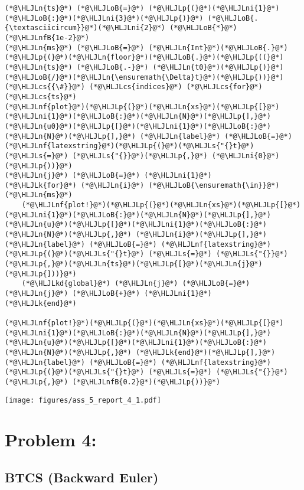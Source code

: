\documentclass[12pt,a4paper]{article}
\newcommand{\HLJLk}[1]{\textcolor[RGB]{148,91,176}{\textbf{#1}}}
\newcommand{\HLJLkd}[1]{\textcolor[RGB]{214,102,97}{\textit{#1}}}
\newcommand{\HLJLn}[1]{#1}
\newcommand{\HLJLnf}[1]{\textcolor[RGB]{66,102,213}{#1}}
\newcommand{\HLJLs}[1]{\textcolor[RGB]{201,61,57}{#1}}
\newcommand{\HLJLnfB}[1]{\textcolor[RGB]{59,151,46}{#1}}
\newcommand{\HLJLni}[1]{\textcolor[RGB]{59,151,46}{#1}}
\newcommand{\HLJLoB}[1]{\textcolor[RGB]{102,102,102}{\textbf{#1}}}
\newcommand{\HLJLp}[1]{#1}
\newcommand{\HLJLcs}[1]{\textcolor[RGB]{153,153,119}{\textit{#1}}}
\begin{document}
\begin{lstlisting}
(*@\HLJLn{ts}@*) (*@\HLJLoB{=}@*) (*@\HLJLp{(}@*)(*@\HLJLni{1}@*)(*@\HLJLoB{:}@*)(*@\HLJLni{3}@*)(*@\HLJLp{)}@*) (*@\HLJLoB{.{\textasciicircum}}@*)(*@\HLJLni{2}@*) (*@\HLJLoB{*}@*) (*@\HLJLnfB{1e-2}@*)
(*@\HLJLn{ms}@*) (*@\HLJLoB{=}@*) (*@\HLJLn{Int}@*)(*@\HLJLoB{.}@*)(*@\HLJLp{(}@*)(*@\HLJLn{floor}@*)(*@\HLJLoB{.}@*)(*@\HLJLp{((}@*)(*@\HLJLn{ts}@*) (*@\HLJLoB{.-}@*) (*@\HLJLn{t0}@*)(*@\HLJLp{)}@*)(*@\HLJLoB{/}@*)(*@\HLJLn{\ensuremath{\Delta}t}@*)(*@\HLJLp{))}@*)(*@\HLJLcs{{\#}}@*) (*@\HLJLcs{indices}@*) (*@\HLJLcs{for}@*) (*@\HLJLcs{ts}@*)
(*@\HLJLnf{plot}@*)(*@\HLJLp{(}@*)(*@\HLJLn{xs}@*)(*@\HLJLp{[}@*)(*@\HLJLni{1}@*)(*@\HLJLoB{:}@*)(*@\HLJLn{N}@*)(*@\HLJLp{],}@*) (*@\HLJLn{u0}@*)(*@\HLJLp{[}@*)(*@\HLJLni{1}@*)(*@\HLJLoB{:}@*)(*@\HLJLn{N}@*)(*@\HLJLp{],}@*) (*@\HLJLn{label}@*) (*@\HLJLoB{=}@*) (*@\HLJLnf{latexstring}@*)(*@\HLJLp{(}@*)(*@\HLJLs{"{}t}@*) (*@\HLJLs{=}@*) (*@\HLJLs{"{}}@*)(*@\HLJLp{,}@*) (*@\HLJLni{0}@*) (*@\HLJLp{))}@*)
(*@\HLJLn{j}@*) (*@\HLJLoB{=}@*) (*@\HLJLni{1}@*)
(*@\HLJLk{for}@*) (*@\HLJLn{i}@*) (*@\HLJLoB{\ensuremath{\in}}@*) (*@\HLJLn{ms}@*)
    (*@\HLJLnf{plot!}@*)(*@\HLJLp{(}@*)(*@\HLJLn{xs}@*)(*@\HLJLp{[}@*)(*@\HLJLni{1}@*)(*@\HLJLoB{:}@*)(*@\HLJLn{N}@*)(*@\HLJLp{],}@*) (*@\HLJLn{u}@*)(*@\HLJLp{[}@*)(*@\HLJLni{1}@*)(*@\HLJLoB{:}@*)(*@\HLJLn{N}@*)(*@\HLJLp{,}@*) (*@\HLJLn{i}@*)(*@\HLJLp{],}@*) (*@\HLJLn{label}@*) (*@\HLJLoB{=}@*) (*@\HLJLnf{latexstring}@*)(*@\HLJLp{(}@*)(*@\HLJLs{"{}t}@*) (*@\HLJLs{=}@*) (*@\HLJLs{"{}}@*)(*@\HLJLp{,}@*)(*@\HLJLn{ts}@*)(*@\HLJLp{[}@*)(*@\HLJLn{j}@*)(*@\HLJLp{]))}@*)
    (*@\HLJLkd{global}@*) (*@\HLJLn{j}@*) (*@\HLJLoB{=}@*) (*@\HLJLn{j}@*) (*@\HLJLoB{+}@*) (*@\HLJLni{1}@*)
(*@\HLJLk{end}@*)

(*@\HLJLnf{plot!}@*)(*@\HLJLp{(}@*)(*@\HLJLn{xs}@*)(*@\HLJLp{[}@*)(*@\HLJLni{1}@*)(*@\HLJLoB{:}@*)(*@\HLJLn{N}@*)(*@\HLJLp{],}@*) (*@\HLJLn{u}@*)(*@\HLJLp{[}@*)(*@\HLJLni{1}@*)(*@\HLJLoB{:}@*)(*@\HLJLn{N}@*)(*@\HLJLp{,}@*) (*@\HLJLk{end}@*)(*@\HLJLp{],}@*) (*@\HLJLn{label}@*) (*@\HLJLoB{=}@*) (*@\HLJLnf{latexstring}@*)(*@\HLJLp{(}@*)(*@\HLJLs{"{}t}@*) (*@\HLJLs{=}@*) (*@\HLJLs{"{}}@*)(*@\HLJLp{,}@*) (*@\HLJLnfB{0.2}@*)(*@\HLJLp{))}@*)
\end{lstlisting}

\texttt{[image: figures/ass\_5\_report\_4\_1.pdf]}

\section{Problem 4:}
\subsection{BTCS (Backward Euler)}
\end{document}

